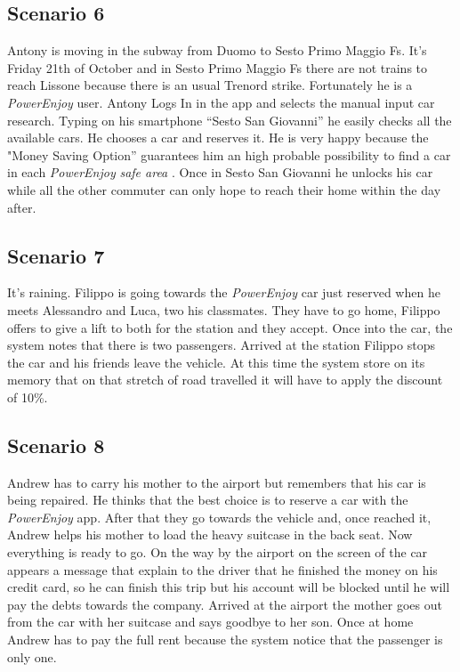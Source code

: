 \documentclass[english]{article}
\newcommand{\powerenjoy}{\textit{PowerEnjoy }}
\newcommand{\safearea}{\textit{safe area }}
\begin{document}
	\subsection{Scenario 6}
		Antony is moving in the subway from Duomo to Sesto Primo Maggio Fs. It's Friday 21th of October and in Sesto Primo Maggio Fs there are not trains to reach Lissone because there is an usual Trenord strike. Fortunately he is a \powerenjoy user. Antony Logs In in the app and selects the manual input car research. Typing on his smartphone ``Sesto San Giovanni'' he easily checks all the available  cars. He chooses a car and reserves it. He is very happy because the "Money Saving Option'' guarantees him an high probable possibility to find a car in each \powerenjoy \safearea. Once in Sesto San Giovanni he unlocks his car while all the other commuter can only hope to reach their home within the day after.
	\subsection{Scenario 7}
		It's raining. Filippo is going towards the \powerenjoy car just reserved when he meets Alessandro and Luca, two his classmates. They have to go home, Filippo offers to give a lift to both for the station and they accept. Once into the car, the system notes that there is two passengers. Arrived at the station Filippo stops the car and his friends leave the vehicle. At this time the system store on its memory that on that stretch of road travelled it will have to apply the discount of 10\%.
	\subsection{Scenario 8}
		Andrew has to carry his mother to the airport but remembers that his car is being repaired. He thinks that the best choice is to reserve a car with the \powerenjoy app. After that they go towards the vehicle and, once reached it, Andrew helps his mother to load the heavy suitcase in the back seat. Now everything is ready to go. On the way by the airport on the screen of the car appears a message that explain to the driver that he finished the money on his credit card, so he can finish this trip but his account will be blocked until he will pay the debts towards the company. Arrived at the airport the mother goes out from the car with her suitcase and says goodbye to her son. Once at home Andrew has to pay the full rent because the system notice that the passenger is only one.
\end{document}
